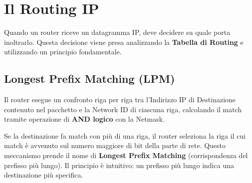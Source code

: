 \section{Il Routing IP}

Quando un router riceve un datagramma IP, deve decidere su quale porta inoltrarlo. Questa decisione viene presa analizzando la \textbf{Tabella di Routing} e utilizzando un principio fondamentale.

\subsection{Longest Prefix Matching (LPM)}
Il router esegue un confronto riga per riga tra l'Indirizzo IP di Destinazione contenuto nel pacchetto e la Network ID di ciascuna riga, calcolando il match tramite operazione di \textbf{AND logico} con la Netmask.

Se la destinazione fa match con più di una riga, il router seleziona la riga il cui match è avvenuto sul numero maggiore di bit della parte di rete. Questo meccanismo prende il nome di \textbf{Longest Prefix Matching} (corrispondenza del prefisso più lungo). Il principio è intuitivo: un prefisso più lungo indica una destinazione più specifica.

